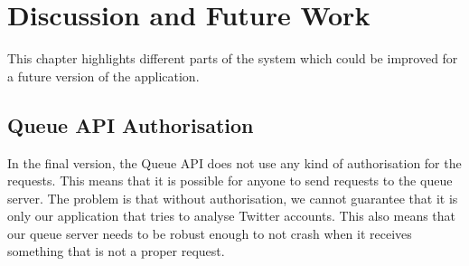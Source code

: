 \chapter{Discussion and Future Work}\label{fwork}
This chapter highlights different parts of the system which could
be improved for a future version of the application.

% 



\section*{Queue API Authorisation}\label{disc:auth}
In the final version, the Queue API does not use any kind of authorisation for
the requests. This means that it is possible for anyone to send requests to the
queue server. The problem is that without authorisation, we cannot guarantee
that it is only our application that tries to analyse Twitter accounts. This
also means that our queue server needs to be robust enough to not crash when it
receives something that is not a proper request. \nl

